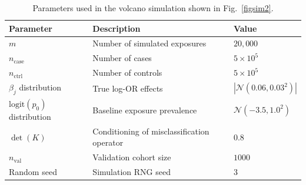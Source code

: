 \documentclass[pdflatex,sn-mathphys-num]{sn-jnl}%
\theoremstyle{thmstyleone}%
\theoremstyle{thmstyletwo}%
\theoremstyle{thmstylethree}%
\begin{document}
\begin{table}[t]
\centering
\caption{Parameters used in the volcano simulation shown in Fig.~\ref{figsim2}.}
\label{tab:sim-volcano-params}
\begin{tabular}{lll}
\hline
Parameter & Description & Value \\
\hline
\(m\) & Number of simulated exposures & \(20{,}000\) \\
\(n_{\mathrm{case}}\) & Number of cases & \(5\times10^{5}\) \\
\(n_{\mathrm{ctrl}}\) & Number of controls & \(5\times10^{5}\) \\
\(\beta_j\) distribution & True log-OR effects & \(|\mathcal{N}(0.06,0.03^2)|\) \\
\(\mathrm{logit}(p_0)\) distribution & Baseline exposure prevalence & \(\mathcal{N}(-3.5,1.0^2)\) \\
\(\det(K)\) & Conditioning of misclassification operator & \(0.8\) \\
\(n_{\mathrm{val}}\) & Validation cohort size & \(1000\) \\
Random seed & Simulation RNG seed & \(3\) \\
\hline
\end{tabular}
\end{table}
\end{document}
